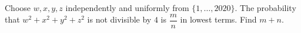 Choose $w,x,y,z$ independently and uniformly from $\{1,\ldots,2020\}$. The probability that $w^2+x^2+y^2+z^2$ is not divisible by $4$ is $\dfrac{m}{n}$ in lowest terms. Find $m+n$.
